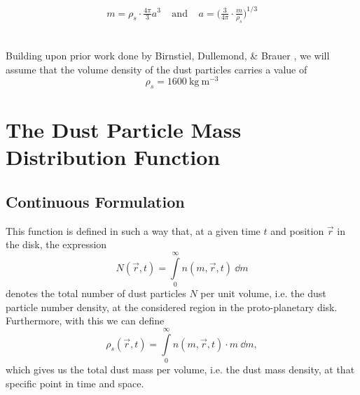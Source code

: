
    \begin{align}
        m
            =\rho_s \cdot \frac{4\pi}{3}a^3
        \ \ \ \ \ \text{and}\ \ \ \ \
        a
            =\bigg(\frac{3}{4\pi} \cdot \frac{m}{\rho_s}\bigg)^{1/3}
    \end{align}

     \\

    Building upon prior work done by Birnstiel, Dullemond, \& Brauer %
    \cite{birnstiel_dullemond_brauer_2010}, we will assume that the volume density of the dust 
    particles carries a value of
    $$\rho_s=\SI{1600}{\kilogram\ \meter^{-3}}$$

\clearpage\section{The Dust Particle Mass Distribution Function}

    \subsection{Continuous Formulation}

        This function is defined in such a way that, at a given time $t$ and position $\vec r$ 
        in the disk, the expression
        \begin{equation}
            N(\vec r, t)
                =\int\limits_0^\infty n(m,\vec r, t)\ \dd m
        \end{equation}
        denotes the total number of dust particles $N$ per unit volume, i.e. the dust particle
        number density, at the considered region in the proto-planetary disk. \\

        Furthermore, with this we can define 
        \begin{equation}
            \rho_s(\vec r, t)
                =\int\limits_0^\infty n(m,\vec r, t)\cdot m\ \dd m,
        \end{equation}
        which gives us the total dust mass per volume, i.e. the dust mass density, 
        at that specific point in time and space.

